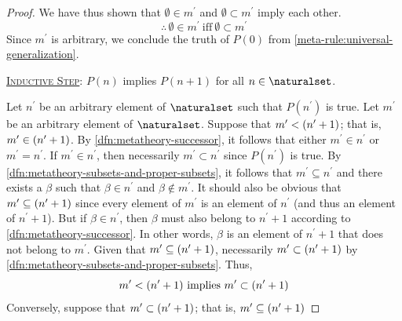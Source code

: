 \begin{proof}
    \vspace{0.3cm}
    \noindent
    We have thus shown that \( \emptyset \in m^{\prime} \) and \( \emptyset \subset m^{\prime} \) imply each other.
    \begin{equation*}
        \therefore \, \emptyset \in m^{\prime} \ \text{iff} \ \emptyset \subset m^{\prime}
    \end{equation*}
    Since \( m^{\prime} \) is arbitrary, we conclude the truth of \( P(0) \) from \cref{meta-rule:universal-generalization}.

    \vspace{0.3cm}
    \noindent
    \underline{\scshape Inductive Step}: \( P(n) \) implies \( P(n + 1) \) for all \( n \in \naturalset \).

    \vspace{0.3cm}
    \noindent
    Let \( n^{\prime} \) be an arbitrary element of \( \naturalset \) such that \( P(n^{\prime}) \) is true.
    Let \( m^{\prime} \) be an arbitrary element of \( \naturalset \).
    Suppose that \( m^{\prime} < \mleft( n^{\prime} + 1 \mright) \); that is, \( m^{\prime} \in \mleft( n^{\prime} + 1 \mright) \).
    By \cref{dfn:metatheory-successor}, it follows that either \( m^{\prime} \in n^{\prime} \) or \( m^{\prime} = n^{\prime} \).
    If \( m^{\prime} \in n^{\prime} \), then necessarily \( m^{\prime} \subset n^{\prime} \) since \( P(n^{\prime}) \) is true.
    By \cref{dfn:metatheory-subsets-and-proper-subsets}, it follows that \( m^{\prime} \subseteq n^{\prime} \) and
    there exists a \( \beta \) such that \( \beta \in n^{\prime} \) and \( \beta \notin m^{\prime} \).
    It should also be obvious that \( m^{\prime} \subseteq \mleft( n^{\prime} + 1 \mright) \) since every element of \( m^{\prime} \) is an
    element of \( n^{\prime} \) (and thus an element of \( n^{\prime} + 1 \)).
    But if \( \beta \in n^{\prime} \), then \( \beta \) must also belong to \( n^{\prime} + 1 \) according to \cref{dfn:metatheory-successor}.
    In other words, \( \beta \) is an element of \( n^{\prime} + 1 \) that does not belong to \( m^{\prime} \).
    Given that \( m^{\prime} \subseteq \mleft( n^{\prime} + 1 \mright) \), necessarily \( m^{\prime} \subset \mleft( n^{\prime} + 1 \mright) \)
    by \cref{dfn:metatheory-subsets-and-proper-subsets}.
    Thus,
    \begin{equation*}
        m^{\prime} < \mleft( n^{\prime} + 1 \mright) \ \text{implies} \ m^{\prime} \subset \mleft( n^{\prime} + 1 \mright)
    \end{equation*}
    Conversely, suppose that \( m^{\prime} \subset \mleft( n^{\prime} + 1 \mright) \); that is, \( m^{\prime} \subseteq \mleft( n^{\prime} + 1 \mright) \)

\end{proof}
